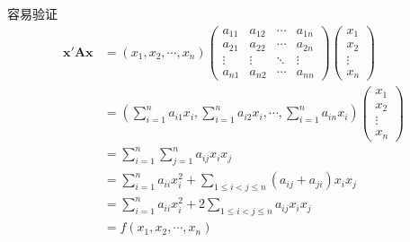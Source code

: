 容易验证\begin{align*}
    \bm{x}'\bm{Ax} & =\left(
    x_1,x_2,\cdots,x_n
    \right)\begin{pmatrix}
               a_{11} & a_{12} & \cdots & a_{1n} \\
               a_{21} & a_{22} & \cdots & a_{2n} \\
               \vdots & \vdots & \ddots & \vdots \\
               a_{n1} & a_{n2} & \cdots & a_{nn}
           \end{pmatrix}\begin{pmatrix}
                            x_1 \\x_2\\\vdots\\x_n
                        \end{pmatrix}                                                 \\
                   & =\left(
    \sum_{i=1}^{n}a_{i1}x_i,\sum_{i=1}^{n}a_{i2}x_i,\cdots,\sum_{i=1}^{n}a_{in}x_i
    \right)\begin{pmatrix}
               x_1 \\x_2\\\vdots\\x_n
           \end{pmatrix}                                                              \\
                   & =\sum_{i=1}^{n}\sum_{j=1}^{n}a_{ij}x_ix_j                                \\
                   & =\sum_{i=1}^{n}a_{ii}x_i^2+\sum_{1\leqslant i<j\leqslant n}\left(
    a_{ij}+a_{ji}
    \right)x_ix_j                                                                             \\
                   & =\sum_{i=1}^{n}a_{ii}x_i^2+2\sum_{1\leqslant i<j\leqslant n}a_{ij}x_ix_j \\
                   & =f\left(
    x_1,x_2,\cdots,x_n
    \right)
\end{align*}

